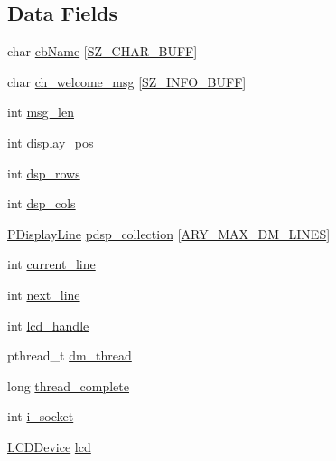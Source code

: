 \subsection*{Data Fields}
\begin{DoxyCompactItemize}
\item 
char \hyperlink{struct___d_i_s_p_l_a_y___m_a_n_a_g_e_r_abfad08e99f5f76d9e63de7d1fb88befd}{cb\+Name} \mbox{[}\hyperlink{skn__common__headers_8h_a8d2978ad614b0de81c60483e706d9306}{S\+Z\+\_\+\+C\+H\+A\+R\+\_\+\+B\+U\+F\+F}\mbox{]}
\item 
char \hyperlink{struct___d_i_s_p_l_a_y___m_a_n_a_g_e_r_a4ddfa233f1e3d41609f10b23a386541e}{ch\+\_\+welcome\+\_\+msg} \mbox{[}\hyperlink{skn__common__headers_8h_a442d5e93bd9c9d8eb4532aba62b5f86c}{S\+Z\+\_\+\+I\+N\+F\+O\+\_\+\+B\+U\+F\+F}\mbox{]}
\item 
int \hyperlink{struct___d_i_s_p_l_a_y___m_a_n_a_g_e_r_a10067d9a5974f5f19bf638ee72ddd973}{msg\+\_\+len}
\item 
int \hyperlink{struct___d_i_s_p_l_a_y___m_a_n_a_g_e_r_aa910f0f6b6ce599a8be02853214d860c}{display\+\_\+pos}
\item 
int \hyperlink{struct___d_i_s_p_l_a_y___m_a_n_a_g_e_r_aeddcffcc90a611efde00a085352bc63b}{dsp\+\_\+rows}
\item 
int \hyperlink{struct___d_i_s_p_l_a_y___m_a_n_a_g_e_r_a8ea0b9503de7da47f210489c8fa19867}{dsp\+\_\+cols}
\item 
\hyperlink{skn__common__headers_8h_a754e9456a497a668b8d959ed2cbe9ec3}{P\+Display\+Line} \hyperlink{struct___d_i_s_p_l_a_y___m_a_n_a_g_e_r_a3a5ccb906320bd6aecbf89cb6b0fc234}{pdsp\+\_\+collection} \mbox{[}\hyperlink{skn__common__headers_8h_a199b80b777af46c9141191749f8f026d}{A\+R\+Y\+\_\+\+M\+A\+X\+\_\+\+D\+M\+\_\+\+L\+I\+N\+E\+S}\mbox{]}
\item 
int \hyperlink{struct___d_i_s_p_l_a_y___m_a_n_a_g_e_r_aae8a6a90422fd9f571dff5f455740aa4}{current\+\_\+line}
\item 
int \hyperlink{struct___d_i_s_p_l_a_y___m_a_n_a_g_e_r_aed299ac3603bba3dfe3c09389122f8d8}{next\+\_\+line}
\item 
int \hyperlink{struct___d_i_s_p_l_a_y___m_a_n_a_g_e_r_a6ebc44b98c1483295586660829eb5a43}{lcd\+\_\+handle}
\item 
pthread\+\_\+t \hyperlink{struct___d_i_s_p_l_a_y___m_a_n_a_g_e_r_a7033f795cd887063d36c11556c368e6f}{dm\+\_\+thread}
\item 
long \hyperlink{struct___d_i_s_p_l_a_y___m_a_n_a_g_e_r_ae20e9cf0e6789ce07c5b8005b4a7ada0}{thread\+\_\+complete}
\item 
int \hyperlink{struct___d_i_s_p_l_a_y___m_a_n_a_g_e_r_a23e726562acd51d59c09eafa6f179137}{i\+\_\+socket}
\item 
\hyperlink{skn__common__headers_8h_a0f995b3ca5c58b83622b2faea0d21cb8}{L\+C\+D\+Device} \hyperlink{struct___d_i_s_p_l_a_y___m_a_n_a_g_e_r_a182e9fb6ca9f11b3e0a35628123d46f5}{lcd}
\end{DoxyCompactItemize}


